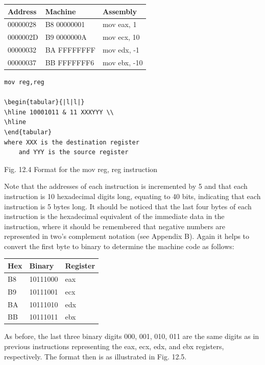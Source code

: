\documentclass[10pt]{book}
\begin{document}
\begin{center}
\begin{tabular}{|l|l|l|}
\hline
Address & Machine & Assembly \\
\hline
00000028 & B8 00000001 & mov eax, 1 \\
\hline
0000002D & B9 0000000A & mov ecx, 10 \\
\hline
00000032 & BA FFFFFFFF & mov edx, -1 \\
\hline
00000037 & BB FFFFFFF6 & mov ebx, -10 \\
\hline
\end{tabular}
\end{center}

\begin{verbatim}
mov reg,reg

\begin{tabular}{|l|l|}
\hline 10001011 & 11 XXXYYY \\
\hline
\end{tabular}
where XXX is the destination register
    and YYY is the source register
\end{verbatim}

Fig. 12.4 Format for the mov reg, reg instruction

Note that the addresses of each instruction is incremented by 5 and that each instruction is 10 hexadecimal digits long, equating to 40 bits, indicating that each instruction is 5 bytes long. It should be noticed that the last four bytes of each instruction is the hexadecimal equivalent of the immediate data in the instruction, where it should be remembered that negative numbers are represented in two's complement notation (see Appendix B). Again it helps to convert the first byte to binary to determine the machine code as follows:

\begin{center}
\begin{tabular}{|l|l|l|}
\hline
Hex & Binary & Register \\
\hline
B8 & 10111000 & eax \\
\hline
B9 & 10111001 & ecx \\
\hline
BA & 10111010 & edx \\
\hline
BB & 10111011 & ebx \\
\hline
\end{tabular}
\end{center}

As before, the last three binary digits 000, 001, 010, 011 are the same digits as in previous instructions representing the eax, ecx, edx, and ebx registers, respectively. The format then is as illustrated in Fig. 12.5.
\end{document}
